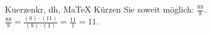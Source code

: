 \begin{MAufgabe}{Kuerzen}{kr, dh, MaTeX}
K\"urzen Sie soweit m\"oglich: $\frac{88}{8}$.\\ 
\ifLsg\MLoesung
\quad $\frac{88}{8}=\frac{(8)\cdot(11)}{(8)\cdot(1)}=\frac{11}{1}=11$.\else\relax\fi
 \end{MAufgabe}